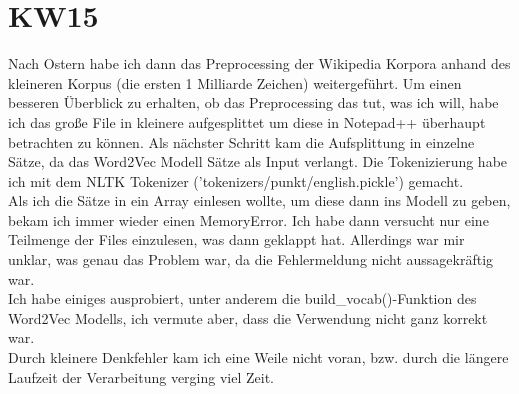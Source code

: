 \documentclass[11pt,a4paper]{article}
\begin{document}
\section*{KW15}
Nach Ostern habe ich dann das Preprocessing der Wikipedia Korpora anhand des kleineren Korpus (die ersten 1 Milliarde Zeichen) weitergeführt. Um einen besseren Überblick zu erhalten, ob das Preprocessing das tut, was ich will, habe ich das große File in kleinere aufgesplittet um diese in Notepad++ überhaupt betrachten zu können. Als nächster Schritt kam die Aufsplittung in einzelne Sätze, da das Word2Vec Modell Sätze als Input verlangt. Die Tokenizierung habe ich mit dem NLTK Tokenizer ('tokenizers/punkt/english.pickle') gemacht.
\\Als ich die Sätze in ein Array einlesen wollte, um diese dann ins Modell zu geben, bekam ich immer wieder einen MemoryError. Ich habe dann versucht nur eine Teilmenge der Files einzulesen, was dann geklappt hat. Allerdings war mir unklar, was genau das Problem war, da die Fehlermeldung nicht aussagekräftig war. 
\\Ich habe einiges ausprobiert, unter anderem die build\_vocab()-Funktion des Word2Vec Modells, ich vermute aber, dass die Verwendung nicht ganz korrekt war.
\\Durch kleinere Denkfehler kam ich eine Weile nicht voran, bzw. durch die längere Laufzeit der Verarbeitung verging viel Zeit.
\end{document}
